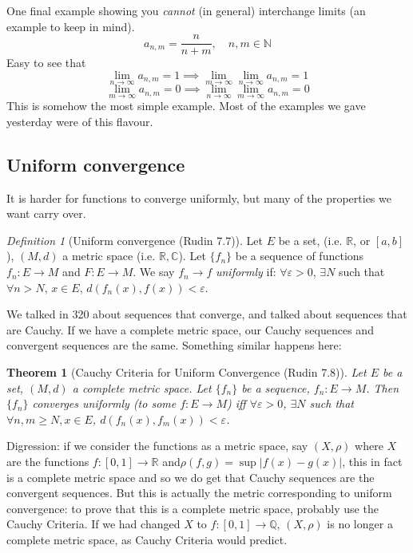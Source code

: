 \documentclass{article}
\theoremstyle{plain}
\newtheorem{theorem}{Theorem}
\theoremstyle{remark}
\newtheorem{definition}{Definition}
\newcommand{\N}{{\mathbb N}}
\newcommand{\Q}{{\mathbb Q}}
\newcommand{\R}{{\mathbb R}}
\newcommand{\C}{{\mathbb C}}
\newcommand{\ep}{{\varepsilon}}
\begin{document}
One final example showing you \emph{cannot} (in general)
interchange limits (an example to keep in mind).
\[
	a_{n,m} = \frac{n}{n+m}, \quad n,m \in \N
\]
Easy to see that
\[
	\lim_{n\to\infty} a_{n,m} = 1
	\implies \lim_{m\to\infty} \lim_{n\to\infty} a_{n,m} = 1
\]
\[
	\lim_{m\to\infty} a_{n,m} = 0 \implies
	\lim_{n\to\infty} \lim_{m\to\infty} a_{n,m} = 0
\]
This is somehow the most simple example.
Most of the examples we gave yesterday were of this flavour.

\subsection{Uniform convergence}
It is harder for functions to converge uniformly,
but many of the properties we want carry over.

\begin{definition}[Uniform convergence (Rudin 7.7)]
	Let $E$ be a set, (i.e. $\R$, or $[a,b]$),
	$(M,d)$ a metric space (i.e. $\R,\C$).
	Let $\{f_n\}$ be a sequence of functions $f_n \colon E \to M$ and $F \colon E \to M$.
	We say $f_n \to f$ \emph{uniformly} if:
	$\forall \ep > 0$, $\exists N$ such that $\forall n > N$, $x \in E$,
	$d(f_n(x), f(x)) < \ep$.
\end{definition}

We talked in 320 about sequences that converge,
and talked about sequences that are Cauchy.
If we have a complete metric space,
our Cauchy sequences and convergent sequences are the same.
Something similar happens here:

\begin{theorem}[Cauchy Criteria for Uniform Convergence (Rudin 7.8)]
	Let $E$ be a set, $(M,d)$ a \emph{complete} metric space.
	Let $\{f_n\}$ be a sequence, $f_n \colon E \to M$.
	Then $\{f_n\}$ converges uniformly (to some $f \colon E \to M$)
	iff $\forall \ep > 0$, $\exists N$ such that
	$\forall n,m \geq  N, x \in E$, $d(f_n(x),f_m(x)) < \ep$.
\end{theorem}

Digression: if we consider the functions as a metric space,
say $(X,\rho)$ where $X$ are the functions $f \colon [0,1] \to \R$
and$\rho(f,g) = \sup\lvert f(x) - g(x) \rvert$,
this in fact is a complete metric space and so we do get that
Cauchy sequences are the convergent sequences.
But this is actually the metric corresponding to uniform convergence:
to prove that this is a complete metric space,
probably use the Cauchy Criteria.
If we had changed $X$ to $f \colon [0,1] \to \Q$, $(X,\rho)$
is no longer a complete metric space, as Cauchy Criteria would predict.
\end{document}
